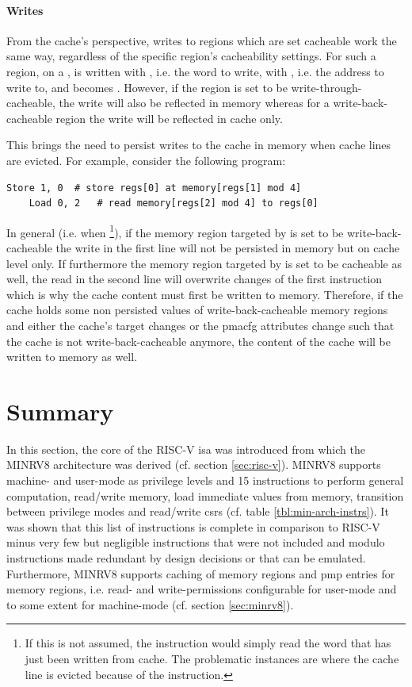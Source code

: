 \paragraph{Writes}
From the cache's perspective, writes to regions which are set cacheable work the same way, regardless of the specific region's cacheability settings.
For such a region, on a ,  is written with , i.e. the word to write,  with , i.e. the address to write to, and  becomes .
However, if the region is set to be write-through-cacheable, the write will also be reflected in memory whereas for a write-back-cacheable region the write will be reflected in cache only.

This brings the need to persist writes to the cache in memory when cache lines are evicted.
For example, consider the following program:
\begin{lstlisting}[language=minrv8]
    Store 1, 0  # store regs[0] at memory[regs[1] mod 4]
    Load 0, 2   # read memory[regs[2] mod 4] to regs[0]
\end{lstlisting}

In general (i.e. when \footnote{%
    If this is not assumed, the  instruction would simply read the word that has just been written from cache.
    The problematic instances are where the cache line is evicted because of the  instruction.
}), if the memory region targeted by  is set to be write-back-cacheable the write in the first line will not be persisted in memory but on cache level only.
If furthermore the memory region targeted by  is set to be cacheable as well, the read in the second line will overwrite changes of the first instruction which is why the cache content must first be written to memory.
Therefore, if the cache holds some non persisted values of write-back-cacheable memory regions and either the cache's target changes or the \gls{pmacfg} attributes change such that the cache is not write-back-cacheable anymore, the content of the cache will be written to memory as well.

\section{Summary}
\label{sec:arch-summary}

In this section, the core of the RISC-V \gls{isa} was introduced from which the MINRV8 architecture was derived (cf. section \ref{sec:risc-v}).
MINRV8 supports machine- and user-mode as privilege levels and 15 instructions to perform general computation, read/write memory, load immediate values from memory, transition between privilege modes and read/write \glspl{csr} (cf. table \ref{tbl:min-arch-instrs}).
It was shown that this list of instructions is complete in comparison to RISC-V minus very few but negligible instructions that were not included and modulo instructions made redundant by design decisions or that can be emulated.
Furthermore, MINRV8 supports caching of memory regions and \gls{pmp} entries for memory regions, i.e. read- and write-permissions configurable for user-mode and to some extent for machine-mode (cf. section \ref{sec:minrv8}).

